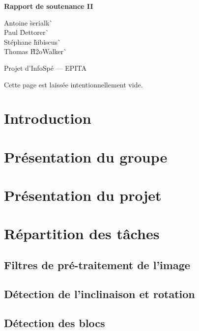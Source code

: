 \documentclass[12pt,a4paper]{article}
\newcommand{\subtitle}{Rapport de soutenance II}
\begin{document}
\begin{titlepage}
\begin{center}
\vspace{8cm}
\vspace{0.5cm}

\LARGE{\textbf{\subtitle}}
\vspace{1cm}

\large{\textsf{Antoine \`serialk\`  \\
Paul \`Dettorer\`  \\
Stéphane \`hibiscus\`  \\
Thomas \`H2oWalker\` }}
\vspace{2cm}

\large{\textsf{Projet d'InfoSpé --- EPITA}}
\end{center}
\end{titlepage}

\newpage
Cette page est laissée intentionnellement vide.

\newpage
\setcounter{tocdepth}{3}
\tableofcontents

\newpage
\pagestyle{headings}
\section{Introduction}

\section{Présentation du groupe}


\newpage
\section{Présentation du projet}


\newpage
\section{Répartition des tâches}
\subsection{Filtres de pré-traitement de l'image}

\newpage
\subsection{Détection de l'inclinaison et rotation}

\newpage
\subsection{Détection des blocs}

\newpage
\end{document}
